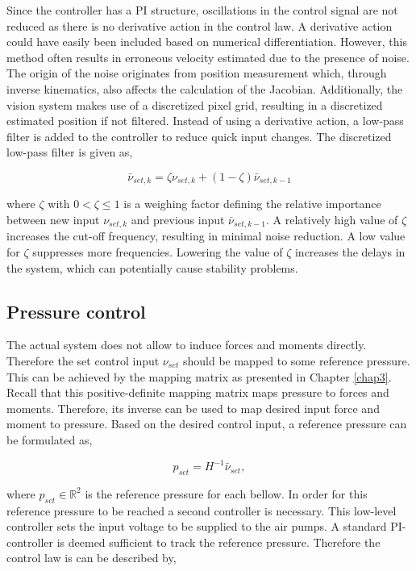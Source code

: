 Since the controller has a PI structure, oscillations in the control signal are not reduced as there is no derivative action in the control law. A derivative action could have easily been included based on numerical differentiation. However, this method often results in erroneous velocity estimated due to the presence of noise. The origin of the noise originates from position measurement which, through inverse kinematics, also affects the calculation of the Jacobian. Additionally, the vision system makes use of a discretized pixel grid, resulting in a discretized estimated position if not filtered. Instead of using a derivative action, a low-pass filter is added to the controller to reduce quick input changes. The discretized low-pass filter is given as,

\begin{equation}
\bar{\nu}_{set,k} = \zeta \nu_{set,k} + (1-\zeta)\bar{\nu}_{set,k-1}
\label{eq4:lowpass}
\end{equation}

where $\zeta$ with $ 0 < \zeta \leq 1$ is a weighing factor defining the relative importance between new input $\nu_{set,k}$ and previous input $\bar{\nu}_{set,k-1}$. A relatively high value of $\zeta$ increases the cut-off frequency, resulting in minimal noise reduction. A low value for $\zeta$ suppresses more frequencies. Lowering the value of $\zeta$ increases the delays in the system, which can potentially cause stability problems. 


\subsection{Pressure control}


The actual system does not allow to induce forces and moments directly. Therefore the set control input $\nu_{set}$ should be mapped to some reference pressure. This can be achieved by the mapping matrix as presented in Chapter \ref{chap3}. Recall that this positive-definite mapping matrix maps pressure to forces and moments. Therefore, its inverse can be used to map desired input force and moment to pressure. Based on the desired control input, a reference pressure can be formulated as,

\begin{equation}
    p_{set} = H^{-1}\bar{\nu}_{set},
\end{equation}


where $p_{set} \in \mathbb{R}^2$ is the reference pressure for each bellow. In order for this reference pressure to be reached a second controller is necessary. This low-level controller sets the input voltage to be supplied to the air pumps. A standard PI-controller is deemed sufficient to track the reference pressure. Therefore the control law is can be described by,

